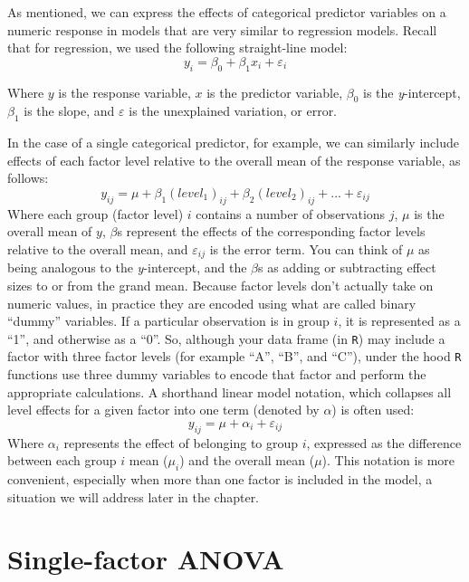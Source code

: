 \documentclass[
]{book}
\begin{document}
As mentioned, we can express the effects of categorical predictor variables on a numeric response in models that are very similar to regression models. Recall that for regression, we used the following straight-line model:
\[y_i=\beta_0+\beta_1x_i+\varepsilon_i\]

Where \(y\) is the response variable, \(x\) is the predictor variable, \(\beta_0\) is the \emph{y}-intercept, \(\beta_1\) is the slope, and \(\varepsilon\) is the unexplained variation, or error.

In the case of a single categorical predictor, for example, we can similarly include effects of each factor level relative to the overall mean of the response variable, as follows:
\[y_{ij}=\mu+\beta_1(level_1)_{ij}+\beta_2(level_2)_{ij}+...+\varepsilon_{ij}\]
Where each group (factor level) \(i\) contains a number of observations \(j\), \(\mu\) is the overall mean of \(y\), \(\beta\)s represent the effects of the corresponding factor levels relative to the overall mean, and \(\varepsilon_{ij}\) is the error term. You can think of \(\mu\) as being analogous to the \emph{y}-intercept, and the \(\beta\)s as adding or subtracting effect sizes to or from the grand mean. Because factor levels don't actually take on numeric values, in practice they are encoded using what are called binary ``dummy'' variables. If a particular observation is in group \(i\), it is represented as a ``1'', and otherwise as a ``0''. So, although your data frame (in \texttt{R}) may include a factor with three factor levels (for example ``A'', ``B'', and ``C''), under the hood \texttt{R} functions use three dummy variables to encode that factor and perform the appropriate calculations. A shorthand linear model notation, which collapses all level effects for a given factor into one term (denoted by \(\alpha\)) is often used:
\[y_{ij}=\mu+\alpha_i+\varepsilon_{ij}\]
Where \(\alpha_i\) represents the effect of belonging to group \(i\), expressed as the difference between each group \(i\) mean (\(\mu_i\)) and the overall mean (\(\mu\)). This notation is more convenient, especially when more than one factor is included in the model, a situation we will address later in the chapter.

\hypertarget{single-factor-anova}{%
\section{Single-factor ANOVA}\label{single-factor-anova}}
\end{document}
